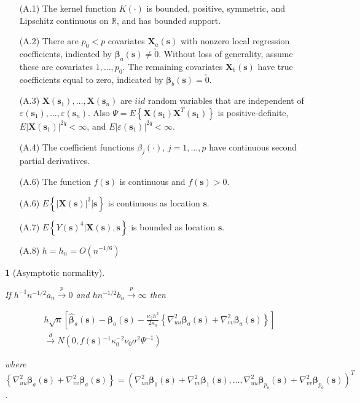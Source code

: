 \documentclass[english]{article}\usepackage[]{graphicx}\usepackage[]{color}
\theoremstyle{plain}
\newtheorem{thm}{\protect\theoremname}
\theoremstyle{plain}
\providecommand{\theoremname}{Theorem}
\begin{document}
\begin{itemize}
\item[(A.1)] The kernel function $K\left(\cdot\right)$ is bounded, positive,
symmetric, and Lipschitz continuous on $\mathbb{R}$, and has bounded
support.
\item[(A.2)] There are $p_{0}<p$ covariates $\bm{X}_{a}\left(\bm{s}\right)$
with nonzero local regression coefficients, indicated by $\bm{\beta}_{a}(\bm{s})\ne\utilde{0}$.
Without loss of generality, assume these are covariates $1,\dots,p_{0}$.
The remaining covariates $\bm{X}_{b}\left(\bm{s}\right)$ have true
coefficients equal to zero, indicated by $\bm{\beta}_{b}\left(\bm{s}\right)=\utilde{0}$.
\item[(A.3)] $\bm{X}\left(\bm{s}_{1}\right),\dots,\bm{X}\left(\bm{s}_{n}\right)$
are $iid$ random variables that are independent of $\varepsilon\left(\bm{s}_{1}\right),\dots,\varepsilon\left(\bm{s}_{n}\right)$.
Also $\Psi=E\left\{ \bm{X}\left(\bm{s}_{1}\right)\bm{X}^{T}\left(\bm{s}_{1}\right)\right\} $
is positive-definite, $E\left|\bm{X}\left(\bm{s}_{1}\right)\right|^{2q}<\infty$,
and $E\left|\varepsilon\left(\bm{s}_{1}\right)\right|^{2q}<\infty$.
\item[(A.4)] The coefficient functions $ $$\beta_{j}\left(\cdot\right)$, $j=1,\dots,p$
have continuous second partial derivatives.
\item[(A.6)] The function $f\left(\bm{s}\right)$ is continuous and $f\left(\bm{s}\right)>0$.
\item[(A.6)] $E\left\{ \left|\bm{X}\left(\bm{s}\right)\right|^{3}|\bm{s}\right\} $
is continuous as location $\bm{s}$.
\item[(A.7)] $E\left\{ Y\left(\bm{s}\right)^{4}|\bm{X}\left(\bm{s}\right),\bm{s}\right\} $
is bounded as location $\bm{s}$.
\item[(A.8)] $h=h_{n}=O\left(n^{-1/6}\right)$\end{itemize}
\begin{thm}[Asymptotic normality]
\label{theorem:normality} 



If $h^{-1}n^{-1/2}a_{n}\xrightarrow{p}0$ and $hn^{-1/2}b_{n}\xrightarrow{p}\infty$
then

\begin{multline*}
h\sqrt{n}\left[\hat{\bm{\beta}}_{a}\left(\bm{s}\right)-\bm{\beta}_{a}\left(\bm{s}\right)-\frac{\kappa_{2}h^{2}}{2\kappa_{0}}\left\{ \nabla_{uu}^{2}\bm{\beta}_{a}\left(\bm{s}\right)+\nabla_{vv}^{2}\bm{\beta}_{a}\left(\bm{s}\right)\right\} \right]\\
\xrightarrow{d}N\left(0,f\left(\bm{s}\right){}^{-1}\kappa_{0}^{-2}\nu_{0}\sigma^{2}\Psi^{-1}\right)
\end{multline*}


where $\left\{ \nabla_{uu}^{2}\bm{\beta}_{a}\left(\bm{s}\right)+\nabla_{vv}^{2}\bm{\beta}_{a}\left(\bm{s}\right)\right\} =\left(\nabla_{uu}^{2}\bm{\beta}_{1}\left(\bm{s}\right)+\nabla_{vv}^{2}\bm{\beta}_{1}\left(\bm{s}\right),\dots,\nabla_{uu}^{2}\bm{\beta}_{p_{o}}\left(\bm{s}\right)+\nabla_{vv}^{2}\bm{\beta}_{p_{o}}\left(\bm{s}\right)\right)^{T}$.
\end{thm}
\end{document}
